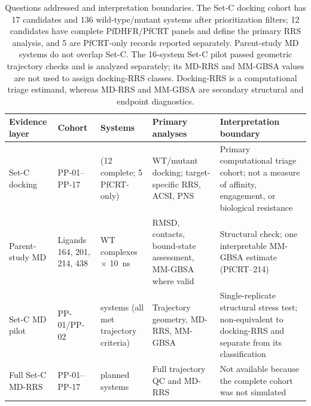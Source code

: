 \begin{table}[htbp]
\centering
\caption{Questions addressed and interpretation boundaries. The Set-C docking cohort has 17 candidates and 136 wild-type/mutant systems after prioritization filters; 12 candidates have complete PfDHFR/PfCRT panels and define the primary RRS analysis, and 5 are PfCRT-only records reported separately. Parent-study MD systems do not overlap Set-C. The 16-system Set-C pilot passed geometric trajectory checks and is analyzed separately; its MD-RRS and MM-GBSA values are not used to assign docking-RRS classes. Docking-RRS is a computational triage estimand, whereas MD-RRS and MM-GBSA are secondary structural and endpoint diagnostics.}
\label{tab:s6_cohort_estimands}
\scriptsize
\begin{tabularx}{\textwidth}{>{\raggedright\arraybackslash}p{} >{\raggedright\arraybackslash}p{} >{\raggedright\arraybackslash}p{} >{\raggedright\arraybackslash}X >{\raggedright\arraybackslash}X}
\toprule
Evidence layer & Cohort & Systems & Primary analyses & Interpretation boundary \\
\midrule
Set-C docking & PP-01--PP-17 & 136 (12 complete; 5 PfCRT-only) & WT/mutant docking; target-specific RRS, ACSI, PNS & Primary computational triage cohort; not a measure of affinity, engagement, or biological resistance \\
Parent-study MD & Ligands 164, 201, 214, 438 & 4 WT complexes $\times$ \SI{10}{\nano\second} & RMSD, contacts, bound-state assessment, MM-GBSA where valid & Structural check; one interpretable MM-GBSA estimate (PfCRT--214) \\
Set-C MD pilot & PP-01/PP-02 & 16 systems (all met trajectory criteria) & Trajectory geometry, MD-RRS, MM-GBSA & Single-replicate structural stress test; non-equivalent to docking-RRS and separate from its classification \\
Full Set-C MD-RRS & PP-01--PP-17 & 136 planned systems & Full trajectory QC and MD-RRS & Not available because the complete cohort was not simulated \\
\bottomrule
\end{tabularx}
\end{table}
